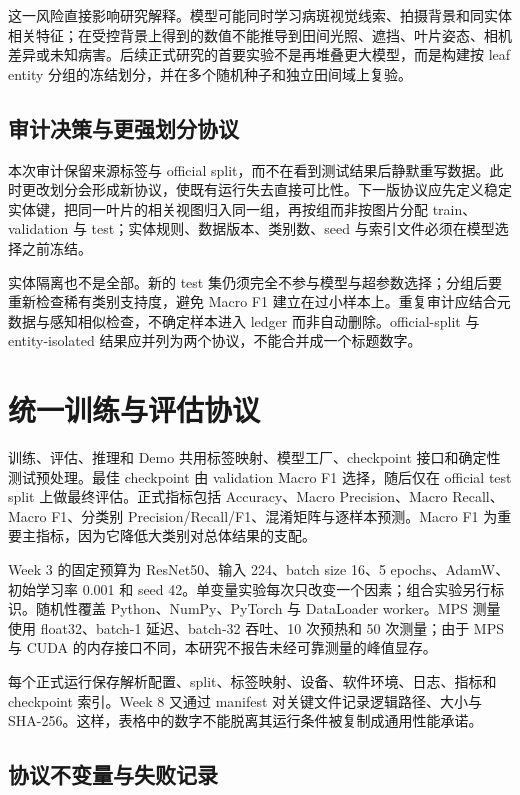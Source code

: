 \documentclass[UTF8,11pt]{ctexart}
\begin{document}
这一风险直接影响研究解释。模型可能同时学习病斑视觉线索、拍摄背景和同实体相关特征；在受控背景上得到的数值不能推导到田间光照、遮挡、叶片姿态、相机差异或未知病害。后续正式研究的首要实验不是再堆叠更大模型，而是构建按 leaf entity 分组的冻结划分，并在多个随机种子和独立田间域上复验。

\subsection*{审计决策与更强划分协议}

本次审计保留来源标签与 official split，而不在看到测试结果后静默重写数据。此时更改划分会形成新协议，使既有运行失去直接可比性。下一版协议应先定义稳定实体键，把同一叶片的相关视图归入同一组，再按组而非按图片分配 train、validation 与 test；实体规则、数据版本、类别数、seed 与索引文件必须在模型选择之前冻结。

实体隔离也不是全部。新的 test 集仍须完全不参与模型与超参数选择；分组后要重新检查稀有类别支持度，避免 Macro F1 建立在过小样本上。重复审计应结合元数据与感知相似检查，不确定样本进入 ledger 而非自动删除。official-split 与 entity-isolated 结果应并列为两个协议，不能合并成一个标题数字。

\section{统一训练与评估协议}

训练、评估、推理和 Demo 共用标签映射、模型工厂、checkpoint 接口和确定性测试预处理。最佳 checkpoint 由 validation Macro F1 选择，随后仅在 official test split 上做最终评估。正式指标包括 Accuracy、Macro Precision、Macro Recall、Macro F1、分类别 Precision/Recall/F1、混淆矩阵与逐样本预测。Macro F1 为重要主指标，因为它降低大类别对总体结果的支配。

Week 3 的固定预算为 ResNet50、输入 224、batch size 16、5 epochs、AdamW、初始学习率 0.001 和 seed 42。单变量实验每次只改变一个因素；组合实验另行标识。随机性覆盖 Python、NumPy、PyTorch 与 DataLoader worker。MPS 测量使用 float32、batch-1 延迟、batch-32 吞吐、10 次预热和 50 次测量；由于 MPS 与 CUDA 的内存接口不同，本研究不报告未经可靠测量的峰值显存。

每个正式运行保存解析配置、split、标签映射、设备、软件环境、日志、指标和 checkpoint 索引。Week 8 又通过 manifest 对关键文件记录逻辑路径、大小与 SHA-256。这样，表格中的数字不能脱离其运行条件被复制成通用性能承诺。

\subsection*{协议不变量与失败记录}
\end{document}
